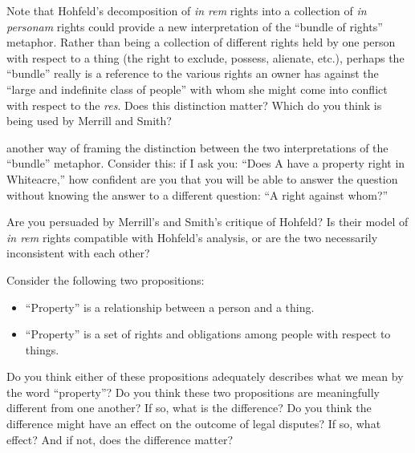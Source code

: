 
\item Note that Hohfeld's decomposition of \textit{in rem} rights into a
collection of \textit{in personam} rights could provide a new interpretation of
the ``bundle of rights'' metaphor. Rather than being a collection of different
rights held by one person with respect to a thing (the right to exclude,
possess, alienate, etc.), perhaps the ``bundle'' really is a reference to the
various rights an owner has against the ``large and indefinite class of
people'' with whom she might come into conflict with respect to
the \textit{res}. Does this distinction matter?
Which do you think is being used by
Merrill and Smith?

\item
{}
another way of framing the distinction
between the two interpretations of the ``bundle'' metaphor. Consider this: if I
ask you: ``Does A have a property right in Whiteacre,'' how confident are you
that you will be able to answer the question without knowing the answer to a
different question: ``A right against whom?''

\item Are you persuaded by Merrill's and Smith's critique of Hohfeld? Is their
model of \textit{in rem} rights compatible with Hohfeld's analysis, or are the
two necessarily inconsistent with each other?

\item Consider the following two propositions: 
\begin{itemize}
\item ``Property'' is a relationship between a person and a thing.
\item ``Property'' is a set of rights and obligations among people with
respect to things.
\end{itemize}
Do you think either of these propositions adequately describes what we mean by
the word ``property''? Do you think these two propositions are meaningfully
different from one another? If so, what is the difference? Do you think the
difference might have an effect on the outcome of legal disputes? If so, what
effect? And if not, does the difference matter?

